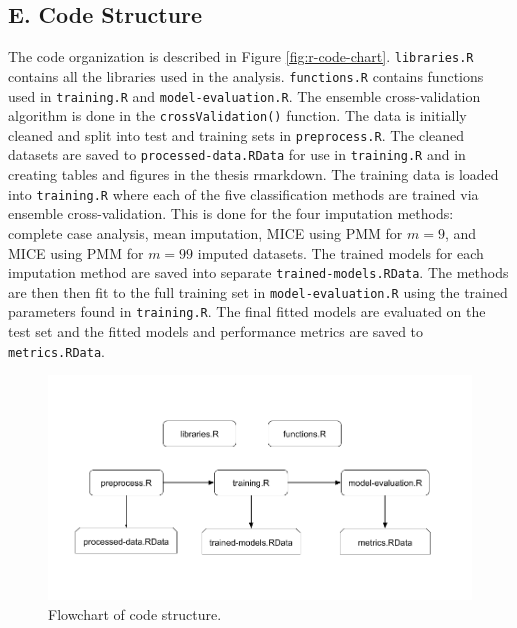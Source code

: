 \documentclass[12pt,]{article}
\newcommand{\appendixE}{ \setcounter{table}{0} \renewcommand{\thetable}{E\arabic{table}} \setcounter{figure}{0} \renewcommand{\thefigure}{E\arabic{figure}} }
\begin{document}
\subsection*{E. Code Structure}\label{e.-code-structure}

\appendixE

The code organization is described in Figure \ref{fig:r-code-chart}.
\texttt{libraries.R} contains all the libraries used in the analysis.
\texttt{functions.R} contains functions used in \texttt{training.R} and
\texttt{model-evaluation.R}. The ensemble cross-validation algorithm is
done in the \texttt{crossValidation()} function. The data is initially
cleaned and split into test and training sets in \texttt{preprocess.R}.
The cleaned datasets are saved to \texttt{processed-data.RData} for use
in \texttt{training.R} and in creating tables and figures in the thesis
rmarkdown. The training data is loaded into \texttt{training.R} where
each of the five classification methods are trained via ensemble
cross-validation. This is done for the four imputation methods: complete
case analysis, mean imputation, MICE using PMM for \(m=9\), and MICE
using PMM for \(m=99\) imputed datasets. The trained models for each
imputation method are saved into separate \texttt{trained-models.RData}.
The methods are then then fit to the full training set in
\texttt{model-evaluation.R} using the trained parameters found in
\texttt{training.R}. The final fitted models are evaluated on the test
set and the fitted models and performance metrics are saved to
\texttt{metrics.RData}.

\begin{figure}[H]

{\centering \includegraphics[width=1\linewidth]{images/r-code-chart} 

}

\caption{\label{fig:r-code-chart}Flowchart of code structure.}\label{fig:unnamed-chunk-16}
\end{figure}
\end{document}
